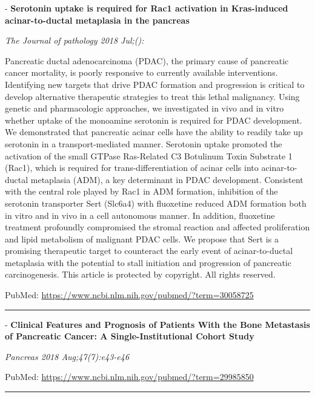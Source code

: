 \documentclass[]{article}
\begin{document}
 - \textbf{Serotonin uptake is required for Rac1 activation in
Kras-induced acinar-to-ductal metaplasia in the pancreas}

\emph{The Journal of pathology 2018 Jul;():}

Pancreatic ductal adenocarcinoma (PDAC), the primary cause of pancreatic
cancer mortality, is poorly responsive to currently available
interventions. Identifying new targets that drive PDAC formation and
progression is critical to develop alternative therapeutic strategies to
treat this lethal malignancy. Using genetic and pharmacologic
approaches, we investigated in vivo and in vitro whether uptake of the
monoamine serotonin is required for PDAC development. We demonstrated
that pancreatic acinar cells have the ability to readily take up
serotonin in a transport-mediated manner. Serotonin uptake promoted the
activation of the small GTPase Ras-Related C3 Botulinum Toxin Substrate
1 (Rac1), which is required for trans-differentiation of acinar cells
into acinar-to-ductal metaplasia (ADM), a key determinant in PDAC
development. Consistent with the central role played by Rac1 in ADM
formation, inhibition of the serotonin transporter Sert (Slc6a4) with
fluoxetine reduced ADM formation both in vitro and in vivo in a cell
autonomous manner. In addition, fluoxetine treatment profoundly
compromised the stromal reaction and affected proliferation and lipid
metabolism of malignant PDAC cells. We propose that Sert is a promising
therapeutic target to counteract the early event of acinar-to-ductal
metaplasia with the potential to stall initiation and progression of
pancreatic carcinogenesis. This article is protected by copyright. All
rights reserved.

PubMed: \url{https://www.ncbi.nlm.nih.gov/pubmed/?term=30058725}

{}

{}

\begin{center}\rule{0.5\linewidth}{\linethickness}\end{center}

 - \textbf{Clinical Features and Prognosis of Patients With the Bone
Metastasis of Pancreatic Cancer: A Single-Institutional Cohort Study}

\emph{Pancreas 2018 Aug;47(7):e43-e46}

PubMed: \url{https://www.ncbi.nlm.nih.gov/pubmed/?term=29985850}

{}

{}

\begin{center}\rule{0.5\linewidth}{\linethickness}\end{center}
\end{document}
